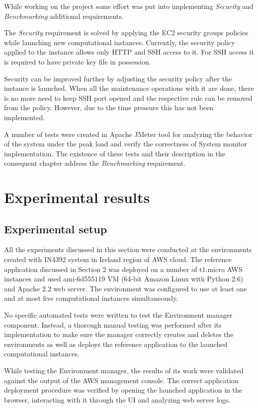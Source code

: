 \documentclass[conference]{IEEEtran}
\begin{document}
While working on the project some effort was put into implementing \emph{Security} and \emph{Benchmarking} additional requirements.

The \emph{Security} requirement is solved by applying the EC2 security groups policies while launching new computational instances. Currently, the security policy applied to the instance allows only HTTP and SSH access to it. For SSH access it is required to have private key file in possession. 

Security can be improved further by adjusting the security policy after the instance is launched. When all the maintenance operations with it are done, there is no more need to keep SSH port opened and the respective rule can be removed from the policy. However, due to the time pressure this has not been implemented.

A number of tests were created in Apache JMeter tool for analyzing the behavior of the system under the peak load and verify the correctness of System monitor implementation. The existence of these tests and their description in the consequent chapter address the \emph{Benchmarking} requirement.

\section{Experimental results}

\subsection{Experimental setup}

All the experiments discussed in this section were conducted at the environments created with IN4392 system in Ireland region of AWS cloud. The reference application discussed in Section 2 was deployed on a number of t1.micro AWS instances and used ami-6d555119 VM (64-bit Amazon Linux with Python 2.6) and Apache 2.2 web server. The environment was configured to use at least one and at most five computational instances simultaneously.

No specific automated tests were written to test the Environment manager component. Instead, a thorough manual testing was performed after its implementation to make sure the manager correctly creates and deletes the environments as well as deploys the reference application to the launched computational instances.

While testing the Environment manager, the results of its work were validated against the output of the AWS management console. The correct application deployment procedure was verified by opening the launched application in the browser, interacting with it through the UI and analyzing web server logs. 
\end{document}
